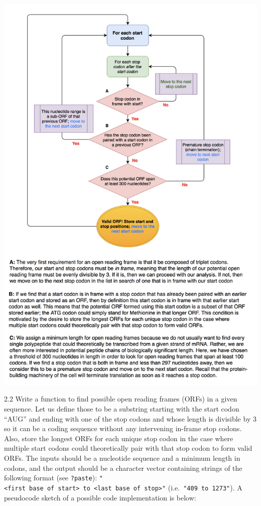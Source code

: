 \documentclass[
]{article}
\begin{document}
\includegraphics{./Images/ORF.png}

2.2 Write a function to find possible open reading frames (ORFs) in a
given sequence. Let us define those to be a substring starting with the
start codon ``AUG'' and ending with one of the stop codons and whose
length is divisible by 3 so it can be a coding sequence without any
intervening in-frame stop codons. Also, store the longest ORFs for each
unique stop codon in the case where multiple start codons could
theoretically pair with that stop codon to form valid ORFs. The inputs
should be a nucleotide sequence and a minimum length in codons, and the
output should be a character vector containing strings of the following
format (see \texttt{?paste}):
\texttt{"\textless{}first\ base\ of\ start\textgreater{}\ to\ \textless{}last\ base\ of\ stop\textgreater{}"}
(i.e.~\texttt{"409\ to\ 1273"}). A pseudocode sketch of a possible code
implementation is below: \span
\end{document}
